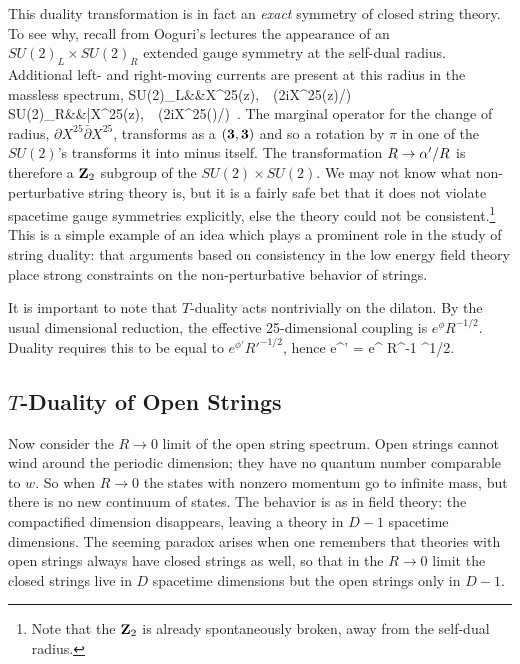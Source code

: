 This duality transformation is in fact an {\it exact} symmetry of closed 
string theory.\cite{dhs}  To see why, recall from Ooguri's lectures
the appearance of an $SU(2)_L \times SU(2)_R$ extended gauge symmetry 
at the self-dual radius.  Additional left- and right-moving 
currents are present at this radius in the massless
spectrum, 
\bea
SU(2)_L\colon&&\partial X^{25}(z),\ \ \exp(\pm 2iX^{25}(z)/\sqrt{\ap})
\nonumber\\
SU(2)_R\colon&&\bar\partial X^{25}(z),\ \ \exp(\pm 2iX^{25}(\zb)/\sqrt{\ap})\
.
\eea
The marginal operator for the change of radius, $\partial X^{25} 
{\bar\partial} X^{25}$, transforms as a $({\bf 3},{\bf 3})$ and so a
rotation by $\pi$ in one of the $SU(2)$'s transforms it into minus itself.
The
transformation $R \to \alpha'/R$ is therefore a ${\bf Z}_2$ subgroup of
the $SU(2) \times SU(2)$.  We may not know what non-perturbative string
theory is, but it is a fairly safe bet that it does not violate spacetime
gauge symmetries explicitly, else the theory could not be
consistent.\footnote{Note that the ${\bf Z}_2$ is already spontaneously
broken, away from the self-dual radius.}  This is a simple example of an
idea which plays a prominent role in the study of string duality: that
arguments based on consistency in the low energy field theory place strong
constraints on the non-perturbative behavior of strings.

It is important to note that $T$-duality acts nontrivially on the
dilaton.\cite{gvb}  By the usual dimensional reduction, the effective
25-dimensional coupling is
$e^{\phi} R^{-1/2}$.  Duality requires this to be equal to 
$e^{\phi'} R'^{-1/2}$, hence
\be
e^{\phi'} = e^{\phi} R^{-1} {\ap}^{1/2}. \label{tdil}
\ee

\subsection{$T$-Duality of Open Strings}

Now consider the $R \to 0$ limit of the open string spectrum.  Open
strings cannot wind around the periodic dimension; they have no quantum
number comparable to $w$.  So when $R \to 0$ the states with nonzero
momentum go to infinite mass, but there is no new continuum of states.
The behavior is as in field theory: the compactified dimension disappears,
leaving a theory in $D-1$ spacetime dimensions.  The seeming paradox
arises when one remembers that theories with open strings always have
closed strings as well, so that in the $R\to 0$ limit the closed strings
live in $D$ spacetime dimensions but the open strings only in $D-1$.

